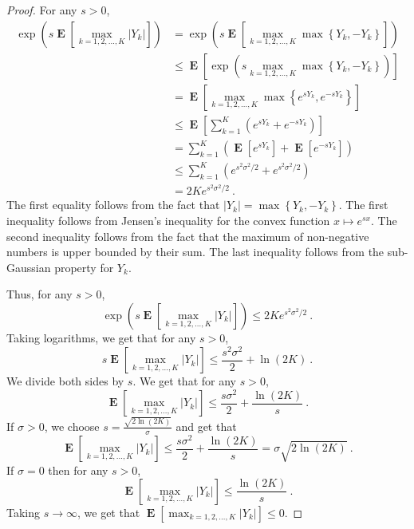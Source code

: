 \documentclass[12pt]{article}
\DeclareMathOperator*{\Exp}{\mathbf{E}}
\theoremstyle{definition}
\begin{document}
\begin{proof}
For any $s > 0$,
\begin{align*}
\exp\left(s \Exp\left[ \max_{k=1,2,\dots,K} |Y_k| \right] \right)
& = \exp\left(s \Exp\left[ \max_{k=1,2,\dots,K} \max \left\{Y_k, -Y_k\right\} \right] \right) \\
& \le \Exp\left[ \exp\left(s \max_{k=1,2,\dots,K} \max \left\{Y_k, -Y_k\right\} \right) \right] \\
& = \Exp\left[ \max_{k=1,2,\dots,K} \max \left\{e^{sY_k}, e^{-sY_k}\right\} \right] \\
& \le \Exp\left[ \sum_{k=1}^K \left( e^{sY_k} + e^{-sY_k} \right) \right] \\
& = \sum_{k=1}^K \left( \Exp\left[ e^{sY_k} \right] + \Exp\left[ e^{-sY_k} \right] \right) \\
& \le \sum_{k=1}^K \left( e^{s^2\sigma^2/2} + e^{s^2\sigma^2/2} \right) \\
& = 2K e^{s^2\sigma^2/2} \: .
\end{align*}
The first equality follows from the fact that $|Y_k| = \max \left\{Y_k,
-Y_k\right\}$. The first inequality follows from Jensen's inequality for the
convex function $x \mapsto e^{sx}$. The second inequality follows from the fact
that the maximum of non-negative numbers is upper bounded by their sum. The last
inequality follows from the sub-Gaussian property for $Y_k$.

Thus, for any $s > 0$,
$$
\exp\left(s \Exp\left[ \max_{k=1,2,\dots,K} |Y_k| \right] \right) \le 2K e^{s^2\sigma^2/2} \: .
$$
Taking logarithms, we get that for any $s > 0$,
$$
s \Exp\left[ \max_{k=1,2,\dots,K} |Y_k| \right] \le \frac{s^2 \sigma^2}{2} + \ln(2K) \: .
$$
We divide both sides by $s$. We get that for any $s > 0$,
$$
\Exp\left[ \max_{k=1,2,\dots,K} |Y_k| \right] \le \frac{s \sigma^2}{2} + \frac{\ln(2K)}{s} \: .
$$
If $\sigma > 0$, we choose $s = \frac{\sqrt{2\ln(2K)}}{\sigma}$ and get that
$$
\Exp\left[ \max_{k=1,2,\dots,K} |Y_k| \right] \le \frac{s \sigma^2}{2} + \frac{\ln(2K)}{s} = \sigma \sqrt{2 \ln(2K)} \: .
$$
If $\sigma = 0$ then for any $s > 0$,
$$
\Exp\left[ \max_{k=1,2,\dots,K} |Y_k| \right] \le \frac{\ln(2K)}{s} \: .
$$
Taking $s \to \infty$, we get that $\Exp\left[ \max_{k=1,2,\dots,K} |Y_k| \right] \le 0$.
\end{proof}

\nocite{*}


\end{document}
